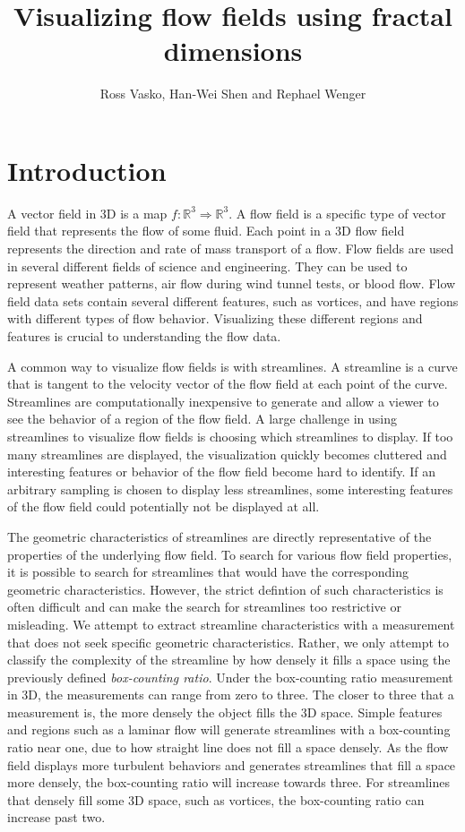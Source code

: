 \documentclass[journal]{vgtc}                %
\title{Visualizing flow fields using fractal dimensions}
\author{Ross Vasko, Han-Wei Shen and Rephael Wenger}
\newcommand {\emath}[1]  {\ensuremath{#1}}
\newcommand {\Real}[1]   {\emath{\mathbb{R}^{#1}}}   %
\newcommand {\Rthree}    {\Real{3}}                  %
\begin{document}
\maketitle

\section{Introduction}

A vector field in 3D is a map $f: \Rthree \Rightarrow \Rthree$.
A flow field is a specific type of vector field that represents the flow of some fluid.
Each point in a 3D flow field represents the direction and rate of mass transport of a flow.
Flow fields are used in several different fields of science and engineering.
They can be used to represent weather patterns, air flow during wind tunnel tests, or blood flow.
Flow field data sets contain several different features, such as vortices, and have regions with different types of flow behavior.
Visualizing these different regions and features is crucial to understanding the flow data.

A common way to visualize flow fields is with streamlines.
A streamline is a curve that is tangent to the velocity vector of the flow field at each point of the curve.
Streamlines are computationally inexpensive to generate and allow a viewer to see the behavior of a region of the flow field.
A large challenge in using streamlines to visualize flow fields is choosing which streamlines to display.
If too many streamlines are displayed, the visualization quickly becomes cluttered and interesting features or behavior of the flow field become hard to identify.
If an arbitrary sampling is chosen to display less streamlines, some interesting features of the flow field could potentially not be displayed at all.

The geometric characteristics of streamlines are directly representative of the properties of the underlying flow field.
To search for various flow field properties, it is possible to search for streamlines that would have the corresponding geometric characteristics.
However, the strict defintion of such characteristics is often difficult and can make the search for streamlines too restrictive or misleading.
We attempt to extract streamline characteristics with a measurement that does not seek specific geometric characteristics.
Rather, we only attempt to classify the complexity of the streamline by how densely it fills a space using the previously defined \textit{box-counting ratio}.
Under the box-counting ratio measurement in 3D, the measurements can range from zero to three.
The closer to three that a measurement is, the more densely the object fills the 3D space.
Simple features and regions such as a laminar flow will generate streamlines with a box-counting ratio near one, due to how straight line does not fill a space densely.
As the flow field displays more turbulent behaviors and generates streamlines that fill a space more densely, the box-counting ratio will increase towards three.
For streamlines that densely fill some 3D space, such as vortices, the box-counting ratio can increase past two.
\end{document}
